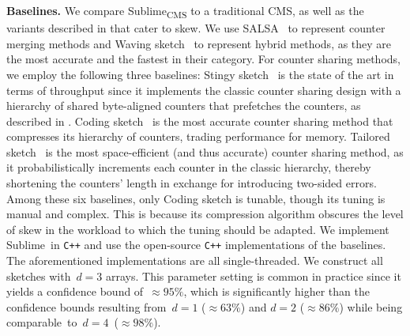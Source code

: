 \documentclass[sigconf]{acmart}
\newcommand{\sketch}{Sublime}
\newcommand{\sketchcms}{\sketch\textsubscript{CMS}\xspace}
\begin{document}
\textbf{Baselines.}
We compare \sketchcms to a traditional CMS, as well as the variants described
in  that cater to
skew. We use SALSA~\cite{SALSA} to represent counter merging methods and Waving
sketch~\cite{WavingSketch} to represent hybrid methods, as they are the most
accurate and the fastest in their category. For counter sharing methods, we
employ the following three baselines: Stingy sketch~\cite{StingySketch} is the
state of the art in terms of throughput since it implements the classic counter
sharing design with a hierarchy of shared byte-aligned counters that prefetches
the counters, as described in
. Coding
sketch~\cite{CodingSketch} is the most accurate counter sharing method that
compresses its hierarchy of counters, trading performance for memory. Tailored
sketch~\cite{TailoredSketch} is the most space-efficient (and thus accurate)
counter sharing method, as it probabilistically increments each counter in the
classic hierarchy, thereby shortening the counters' length in exchange for
introducing two-sided errors. Among these six baselines, only Coding sketch is
tunable, though its tuning is manual and complex. This is because its
compression algorithm obscures the level of skew in the workload to which the
tuning should be adapted. We implement \sketch\ in \texttt{C++} and use the
open-source \texttt{C++} implementations of the baselines. The aforementioned
implementations are all single-threaded. We construct all sketches with~$d=3$
arrays. This parameter setting is common in practice since it yields a
confidence bound of~$\approx 95\%$, which is significantly higher than the
confidence bounds resulting from~$d=1$ ($\approx 63\%$) and $d=2$ ($\approx
86\%$) while being comparable~to~$d=4$~($\approx 98\%$).
\end{document}
